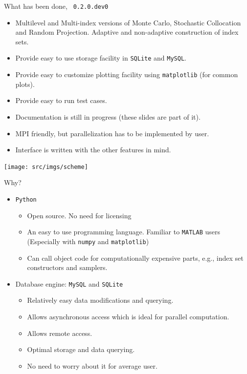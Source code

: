 \begin{frame}{What has been done, \lib~\texttt{0.2.0.dev0}}
  \begin{itemize}
  \item Multilevel and Multi-index versions of Monte Carlo, Stochastic
    Collocation and Random Projection. Adaptive and non-adaptive
    construction of index sets.
  \item Provide easy to use storage facility in \texttt{SQLite} and \texttt{MySQL}.
  \item Provide easy to customize plotting facility using \texttt{matplotlib} (for common
    plots).
  \item Provide easy to run test cases.
  \item Documentation is still in progress (these slides are part of
    it).
  \item MPI friendly, but parallelization has to be implemented by
    user.
  \item Interface is written with the other features in mind.
  \end{itemize}
\end{frame}

\begin{frame}
\centering
\texttt{[image: src/imgs/scheme]}
\end{frame}

\begin{frame}{Why?}
  \begin{itemize}
  \item \texttt{Python}
    \begin{itemize}
    \item Open source. No need for licensing
    \item An easy to use programming language. Familiar to
      \texttt{MATLAB} users (Especially with \texttt{numpy} and \texttt{matplotlib})
    \item Can call object code for computationally expensive parts,
      e.g., index set constructors and samplers.
    \end{itemize}
    \item Database engine: \texttt{MySQL} and \texttt{SQLite}
      \begin{itemize}
      \item Relatively easy data modifications and querying.
      \item Allows asynchronous access which is ideal for parallel computation.
      \item Allows remote access.
      \item Optimal storage and data querying.
      \item No need to worry about it for average user.
      \end{itemize}
    \end{itemize}
\end{frame}

